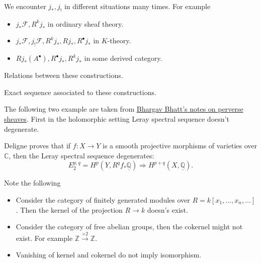 \documentclass[../main.tex]{subfiles}
\begin{document}
\begin{example}[$j_{*}, j_{!}$]
We encounter $j_{*}, j_{!}$ in different situations many times. For example
\begin{itemize}
\item $j_{*}\mathscr{F}, R^{k}j_{*}$ in ordinary sheaf theory.
\item $j_{*}\mathscr{F}, j_{!}\mathscr{F},R^{k}j_{*}, Rj_{*}, R^{\bullet}j_{*}$ in $K$-theory.
\item $Rj_{*}(A^{\bullet}), R^{\bullet}j_{*}, R^{k}j_{*}$ in some derived category.
\end{itemize}
Relations between these constructions.
\begin{itemize}

\end{itemize}
Exact sequence associated to these constructions.


\end{example}


\begin{example}
The following two example are taken from \href{http://www-personal.umich.edu/~takumim/MATH731.pdf}{Bhargav Bhatt's notes on perverse sheaves}. First in the holomorphic setting Leray spectral sequence doesn't degenerate.

\end{example}
\begin{remark}
Deligne proves that if $f: X\rightarrow Y$ is a smooth projective morphisms of varieties over $\mathbb{C}$, then the Leray spectral sequence degenerates:
$$E_{2}^{p,q}=H^{p}(Y, R^{q}f_{*}\underline{\mathbb{Q}})\Rightarrow H^{p+q}(X, \underline{\mathbb{Q}}).$$
\end{remark}


\begin{example}
Note the following 
\begin{itemize}
\item Consider the category of finitely generated modules over $R=k[x_{1}, \dots, x_{n}, \dots]$. Then the kernel of the projection $R\rightarrow k$ doesn's exist.
\item Consider the category of free abelian groups, then the cokernel might not exist. For example $\mathbb{Z}\xrightarrow{\times 2} \mathbb{Z}$.
\item Vanishing of kernel and cokernel do not imply isomorphism.
\end{itemize}
\end{example}
\end{document}

